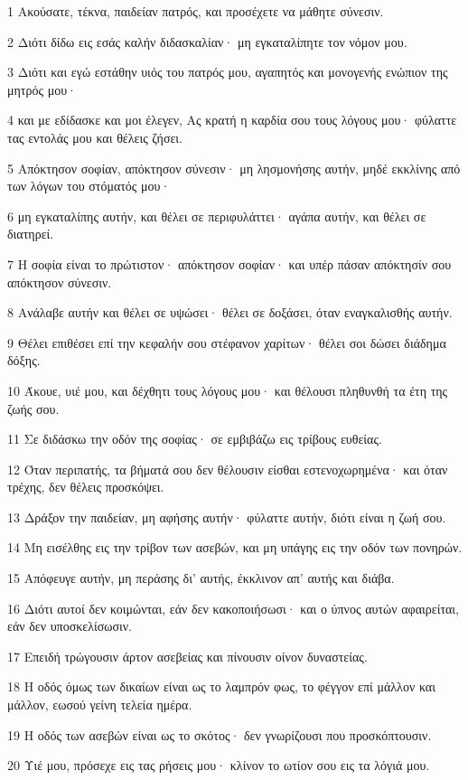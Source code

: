 \par 1 Ακούσατε, τέκνα, παιδείαν πατρός, και προσέχετε να μάθητε σύνεσιν.
\par 2 Διότι δίδω εις εσάς καλήν διδασκαλίαν· μη εγκαταλίπητε τον νόμον μου.
\par 3 Διότι και εγώ εστάθην υιός του πατρός μου, αγαπητός και μονογενής ενώπιον της μητρός μου·
\par 4 και με εδίδασκε και μοι έλεγεν, Ας κρατή η καρδία σου τους λόγους μου· φύλαττε τας εντολάς μου και θέλεις ζήσει.
\par 5 Απόκτησον σοφίαν, απόκτησον σύνεσιν· μη λησμονήσης αυτήν, μηδέ εκκλίνης από των λόγων του στόματός μου·
\par 6 μη εγκαταλίπης αυτήν, και θέλει σε περιφυλάττει· αγάπα αυτήν, και θέλει σε διατηρεί.
\par 7 Η σοφία είναι το πρώτιστον· απόκτησον σοφίαν· και υπέρ πάσαν απόκτησίν σου απόκτησον σύνεσιν.
\par 8 Ανάλαβε αυτήν και θέλει σε υψώσει· θέλει σε δοξάσει, όταν εναγκαλισθής αυτήν.
\par 9 Θέλει επιθέσει επί την κεφαλήν σου στέφανον χαρίτων· θέλει σοι δώσει διάδημα δόξης.
\par 10 Άκουε, υιέ μου, και δέχθητι τους λόγους μου· και θέλουσι πληθυνθή τα έτη της ζωής σου.
\par 11 Σε διδάσκω την οδόν της σοφίας· σε εμβιβάζω εις τρίβους ευθείας.
\par 12 Όταν περιπατής, τα βήματά σου δεν θέλουσιν είσθαι εστενοχωρημένα· και όταν τρέχης, δεν θέλεις προσκόψει.
\par 13 Δράξον την παιδείαν, μη αφήσης αυτήν· φύλαττε αυτήν, διότι είναι η ζωή σου.
\par 14 Μη εισέλθης εις την τρίβον των ασεβών, και μη υπάγης εις την οδόν των πονηρών.
\par 15 Απόφευγε αυτήν, μη περάσης δι' αυτής, έκκλινον απ' αυτής και διάβα.
\par 16 Διότι αυτοί δεν κοιμώνται, εάν δεν κακοποιήσωσι· και ο ύπνος αυτών αφαιρείται, εάν δεν υποσκελίσωσιν.
\par 17 Επειδή τρώγουσιν άρτον ασεβείας και πίνουσιν οίνον δυναστείας.
\par 18 Η οδός όμως των δικαίων είναι ως το λαμπρόν φως, το φέγγον επί μάλλον και μάλλον, εωσού γείνη τελεία ημέρα.
\par 19 Η οδός των ασεβών είναι ως το σκότος· δεν γνωρίζουσι που προσκόπτουσιν.
\par 20 Υιέ μου, πρόσεχε εις τας ρήσεις μου· κλίνον το ωτίον σου εις τα λόγιά μου.
